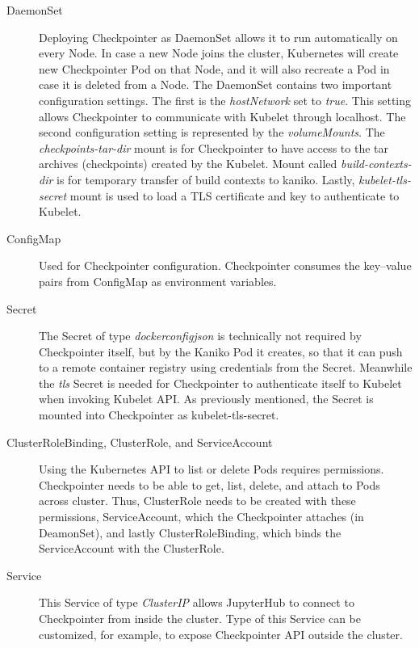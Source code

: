 \documentclass[
  digital,     %
  oneside,     %
  nosansbold,  %
  nocolorbold, %
  lof,         %
  lot,         %
]{fithesis4}
\begin{document}
\begin{description}
    
    \item[DaemonSet] Deploying Checkpointer as DaemonSet allows it to run automatically on every Node. In case a new Node joins the cluster, Kubernetes will create new Checkpointer Pod on that Node, and it will also recreate a Pod in case it is deleted from a Node. The DaemonSet contains two important configuration settings. The first is the \emph{hostNetwork} set to \emph{true}. This setting allows Checkpointer to communicate with Kubelet through localhost. The second configuration setting is represented by the \emph{volumeMounts}. The 
    \emph{checkpoints-tar-dir} mount is for Checkpointer to have access to the tar archives (checkpoints) created by the Kubelet. Mount called \emph{build-contexts-dir} is for temporary transfer of build contexts to kaniko. Lastly, \emph{kubelet-tls-secret} mount is used to load a TLS certificate and key to authenticate to Kubelet.
    
    \item[ConfigMap] Used for Checkpointer configuration. Checkpointer consumes the key--value pairs from ConfigMap as environment variables.    
    
    \item[Secret] The Secret of type \emph{dockerconfigjson} is technically not required by Checkpointer itself, but by the Kaniko Pod it creates, so that it can push to a remote container registry using credentials from the Secret. Meanwhile the \emph{tls} Secret is needed for Checkpointer to authenticate itself to Kubelet when invoking Kubelet API. As previously mentioned, the Secret is mounted into Checkpointer as kubelet-tls-secret.
    
    \item[ClusterRoleBinding, ClusterRole, and ServiceAccount]
    Using the Kubernetes API to list or delete Pods requires permissions. Checkpointer needs to be able to get, list, delete, and attach to Pods across cluster. Thus, ClusterRole needs to be created with these permissions, ServiceAccount, which the Checkpointer attaches (in DeamonSet), and lastly ClusterRoleBinding, which binds the ServiceAccount with the ClusterRole.
    
    \item[Service] This Service of type \emph{ClusterIP} allows JupyterHub to connect to Checkpointer from inside the cluster. Type of this Service can be customized, for example, to expose Checkpointer API outside the cluster.

\end{description}
\end{document}
